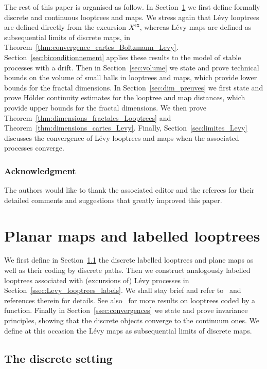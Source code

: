 \documentclass[british, a4paper,11pt]{article}
\numberwithin{equation}{section}
\theoremstyle{definition}
\newcommand{\exc}{\mathrm{ex}}
\begin{document}
The rest of this paper is organised as follow. In Section~\ref{sec:cartes_looptrees} we first define formally discrete and continuous looptrees and maps. We stress again that L\'evy looptrees are defined directly from the excursion $X^{\exc}$, whereas L\'evy maps are defined as subsequential limits of discrete maps, in Theorem~\ref{thm:convergence_cartes_Boltzmann_Levy}. Section~\ref{sec:biconditionnement} applies these results to the model of stable processes with a drift.
Then in Section~\ref{sec:volume} we state and prove technical bounds on the volume of small balls in looptrees and maps, which provide lower bounds for the fractal dimensions.
In Section~\ref{sec:dim_preuves} we first state and prove H\"older continuity estimates for the looptree and map distances, which provide upper bounds for the fractal dimensions. We then prove Theorem~\ref{thm:dimensions_fractales_Looptrees} and Theorem~\ref{thm:dimensions_cartes_Levy}.
Finally, Section~\ref{sec:limites_Levy} discusses the convergence of L\'evy looptrees and maps when the associated processes converge.


\subsubsection*{Acknowledgment}
The authors would like to thank the associated editor and the referees for their detailed comments and suggestions that greatly improved this paper.


\section{Planar maps and labelled looptrees}
\label{sec:cartes_looptrees}


We first define in Section~\ref{ssec:def_discret} the discrete labelled looptrees and plane maps as well as their coding by discrete paths. Then we construct analogously labelled looptrees associated with (excursions of) L\'evy processes in Section~\ref{ssec:Levy_looptrees_labels}. 
We shall stay brief and refer to~\cite{Mar24} and references therein for details. See also~\cite{Kha22} for more results on looptrees coded by a function.
Finally in Section~\ref{ssec:convergences} we state and prove invariance principles, showing that the discrete objects converge to the continuum ones. We define at this occasion the L\'evy maps as subsequential limits of discrete maps.



\subsection{The discrete setting}
\label{ssec:def_discret}
\end{document}
